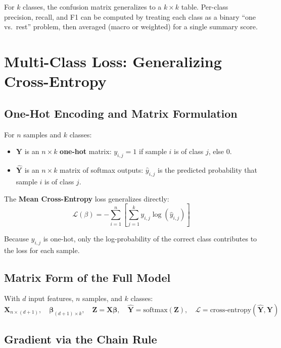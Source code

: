 \documentclass[12pt]{article}
\begin{document}
For $k$ classes, the confusion matrix generalizes to a $k \times k$ table. Per-class precision, recall, and F1 can be computed by treating each class as a binary ``one vs.\ rest'' problem, then averaged (macro or weighted) for a single summary score.

\section{Multi-Class Loss: Generalizing Cross-Entropy}

\subsection{One-Hot Encoding and Matrix Formulation}

For $n$ samples and $k$ classes:
\begin{itemize}
  \item $\boldsymbol{Y}$ is an $n \times k$ \textbf{one-hot} matrix: $y_{i,j} = 1$ if sample $i$ is of class $j$, else 0.
  \item $\hat{\boldsymbol{Y}}$ is an $n \times k$ matrix of softmax outputs: $\hat{y}_{i,j}$ is the predicted probability that sample $i$ is of class $j$.
\end{itemize}

The \textbf{Mean Cross-Entropy} loss generalizes directly:
\[
\boxed{\mathcal{L}(\beta) = -\sum_{i=1}^{n}\left[\sum_{j=1}^{k} y_{i,j}\log(\hat{y}_{i,j})\right]}
\]

Because $y_{i,j}$ is one-hot, only the log-probability of the correct class contributes to the loss for each sample.

\subsection{Matrix Form of the Full Model}

With $d$ input features, $n$ samples, and $k$ classes:
\[
\boldsymbol{X}_{n\times(d+1)},\quad \boldsymbol{\beta}_{(d+1)\times k},\quad \boldsymbol{Z} = \boldsymbol{X}\boldsymbol{\beta},\quad \hat{\boldsymbol{Y}} = \text{softmax}(\boldsymbol{Z}),\quad \mathcal{L} = \text{cross-entropy}(\hat{\boldsymbol{Y}},\boldsymbol{Y})
\]

\subsection{Gradient via the Chain Rule}
\end{document}
